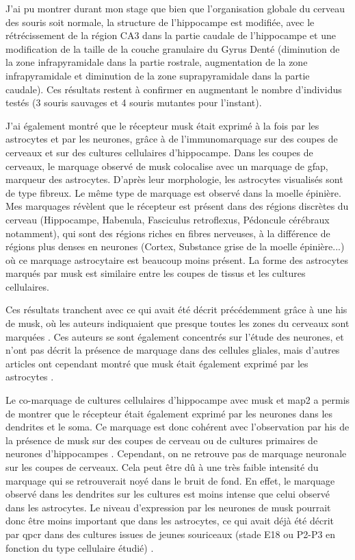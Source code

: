 J'ai pu montrer durant mon stage que bien que l'organisation globale du cerveau des souris \mcrd soit normale, la structure de l'hippocampe est modifiée, avec le rétrécissement de la région CA3 dans la partie caudale de l'hippocampe et une modification de la taille de la couche granulaire du Gyrus Denté (diminution de la zone infrapyramidale dans la partie rostrale, augmentation de la zone infrapyramidale et diminution de la zone suprapyramidale dans la partie caudale). Ces résultats restent à confirmer en augmentant le nombre d'individus testés (3 souris sauvages et 4 souris mutantes pour l'instant).

J'ai également montré que le récepteur \gls{musk} était exprimé à la fois par les astrocytes et par les neurones, grâce à de l'immunomarquage sur des coupes de cerveaux et sur des cultures cellulaires d'hippocampe. Dans les coupes de cerveaux, le marquage observé de \gls{musk} colocalise avec un marquage de \gls{gfap}, marqueur des astrocytes. D'après leur morphologie, les astrocytes visualisés sont de type fibreux. Le même type de marquage est observé dans la moelle épinière. Mes marquages révèlent que le récepteur est présent dans des régions discrètes du cerveau (Hippocampe, Habenula, Fasciculus retroflexus, Pédoncule cérébraux notamment), qui sont des régions riches en fibres nerveuses, à la différence de régions plus denses en neurones (Cortex, Substance grise de la moelle épinière...) où ce marquage astrocytaire est beaucoup moins présent. La forme des astrocytes marqués par \gls{musk} est similaire entre les coupes de tissus et les cultures cellulaires.

Ces résultats tranchent avec ce qui avait été décrit précédemment grâce à une \acrlong{his} de \gls{musk}, où les auteurs indiquaient que presque toutes les zones du cerveaux sont marquées \cite{Garcia-Osta2006}. Ces auteurs se sont également concentrés sur l'étude des neurones, et n'ont pas décrit la présence de marquage dans des cellules gliales, mais d'autres articles ont cependant montré que \gls{musk} était également exprimé par les astrocytes \cite{Sun2016}.

Le co-marquage de cultures cellulaires d'hippocampe avec \gls{musk} et \gls{map2} a permis de montrer que le récepteur était également exprimé par les neurones dans les dendrites et le soma. Ce marquage est donc cohérent avec l'observation par \acrlong{his} de la présence de \gls{musk} sur des coupes de cerveau ou de cultures primaires de neurones d'hippocampes \cite{Garcia-Osta2006}. Cependant, on ne retrouve pas de marquage neuronale sur les coupes de cerveaux. Cela peut être dû à une très faible intensité du marquage qui se retrouverait noyé dans le bruit de fond. En effet, le marquage observé dans les dendrites sur les cultures est moins intense que celui observé dans les astrocytes. Le niveau d'expression par les neurones de \gls{musk} pourrait donc être moins important que dans les astrocytes, ce qui avait déjà été décrit par \gls{qpcr} dans des cultures issues de jeunes souriceaux (stade E18 ou P2-P3 en fonction du type cellulaire étudié) \cite{Sun2016}. 


